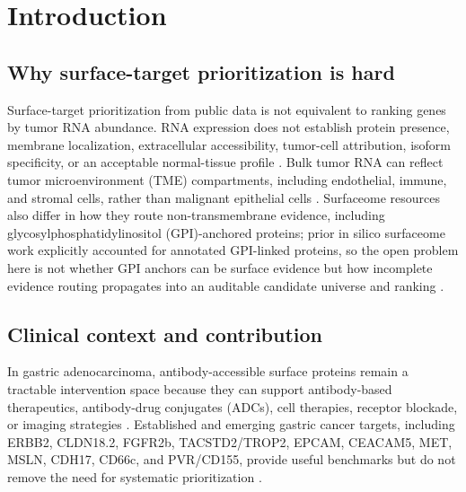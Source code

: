 \documentclass[review,12pt,authoryear]{elsarticle}
\begin{document}
\FloatBarrier
\section{Introduction}

\subsection{Why surface-target prioritization is hard}

Surface-target prioritization from public data is not equivalent to ranking genes by tumor RNA abundance. RNA expression does not establish protein presence, membrane localization, extracellular accessibility, tumor-cell attribution, isoform specificity, or an acceptable normal-tissue profile \citep{uhlen2015hpa,uhlen2017pathology,thul2017subcellular,moek2017adc_landscape,li2024bayests}. Bulk tumor RNA can reflect tumor microenvironment (TME) compartments, including endothelial, immune, and stromal cells, rather than malignant epithelial cells \citep{yoshihara2013estimate,han2023tisch2,zhang2019gastric_scrna,jeong2021gastric_tme}. Surfaceome resources also differ in how they route non-transmembrane evidence, including glycosylphosphatidylinositol (GPI)-anchored proteins;\allowbreak{} prior in silico surfaceome work explicitly accounted for annotated GPI-linked proteins, so the open problem here is not whether GPI anchors can be surface evidence but how incomplete evidence routing propagates into an auditable candidate universe and ranking \citep{bauschfluck2018surfy}.

\subsection{Clinical context and contribution}

In gastric adenocarcinoma, antibody-accessible surface proteins remain a tractable intervention space because they can support antibody-based therapeutics, antibody-drug conjugates (ADCs), cell therapies, receptor blockade, or imaging strategies \citep{bray2024globocan,tcga2014gastric,hu2021surfaceome,bauschfluck2015cspa,bauschfluck2018surfy,li2022pancancer,razzaghdoust2021adc,kathad2024adc,moek2017adc_landscape,li2026gastric_adc_review,katoh2025adhesion_adc}. Established and emerging gastric cancer targets, including ERBB2, CLDN18.2, FGFR2b, TACSTD2/\allowbreak{}TROP2, EPCAM, CEACAM5, MET, MSLN, CDH17, CD66c, and PVR/\allowbreak{}CD155, provide useful benchmarks but do not remove the need for systematic prioritization \citep{bang2010toga,shah2023spotlight,shitara2023glow,wainberg2022fight,xu2025gastric_targets,chang2026gastric_proteogenomics,zhang2025cd66c,zhao2026pvr,li2026gastric_adc_review,katoh2025adhesion_adc,wang2025cdh17_adc}.
\end{document}
